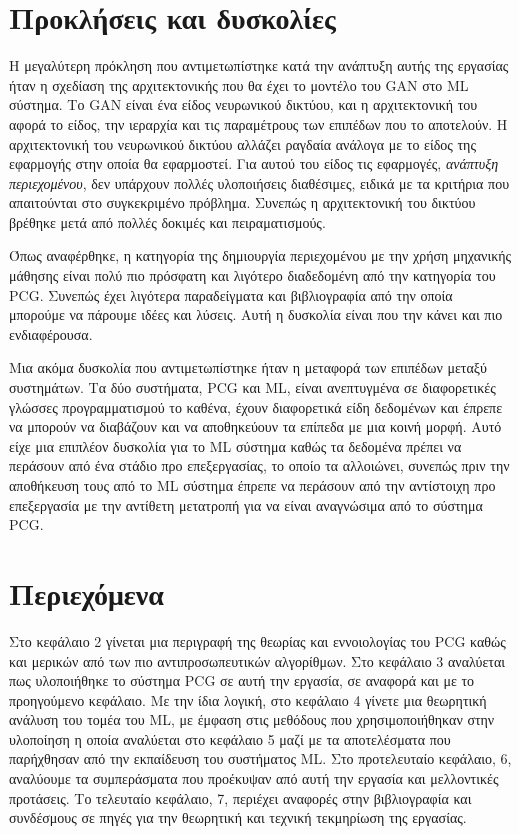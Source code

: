 \section{Προκλήσεις και δυσκολίες}
\par
Η μεγαλύτερη πρόκληση που αντιμετωπίστηκε κατά την ανάπτυξη αυτής της εργασίας ήταν η σχεδίαση της αρχιτεκτονικής που θα έχει το μοντέλο του GAN στο ML σύστημα. Το GAN είναι ένα είδος νευρωνικού δικτύου, και η αρχιτεκτονική του αφορά το είδος, την ιεραρχία και τις παραμέτρους των επιπέδων που το αποτελούν. Η αρχιτεκτονική του νευρωνικού δικτύου αλλάζει ραγδαία ανάλογα με το είδος της εφαρμογής στην οποία θα εφαρμοστεί. Για αυτού του είδος τις εφαρμογές, \textit{ανάπτυξη περιεχομένου}, δεν υπάρχουν πολλές υλοποιήσεις διαθέσιμες, ειδικά με τα κριτήρια που απαιτούνται στο συγκεκριμένο πρόβλημα. Συνεπώς η αρχιτεκτονική του δικτύου βρέθηκε μετά από πολλές δοκιμές και πειραματισμούς.
\par
Όπως αναφέρθηκε, η κατηγορία της δημιουργία περιεχομένου με την χρήση μηχανικής μάθησης είναι πολύ πιο πρόσφατη και λιγότερο διαδεδομένη από την κατηγορία του PCG. Συνεπώς έχει λιγότερα παραδείγματα και βιβλιογραφία από την οποία μπορούμε να πάρουμε ιδέες και λύσεις. Αυτή η δυσκολία είναι που την κάνει και πιο ενδιαφέρουσα.
\par
Μια ακόμα δυσκολία που αντιμετωπίστηκε ήταν η μεταφορά των επιπέδων μεταξύ συστημάτων. Τα δύο συστήματα, PCG και ML, είναι ανεπτυγμένα σε διαφορετικές γλώσσες προγραμματισμού το καθένα, έχουν διαφορετικά είδη δεδομένων και έπρεπε να μπορούν να διαβάζουν και να αποθηκεύουν τα επίπεδα με μια κοινή μορφή. Αυτό είχε μια επιπλέον δυσκολία για το ML σύστημα καθώς τα δεδομένα πρέπει να περάσουν από ένα στάδιο προ επεξεργασίας, το οποίο τα αλλοιώνει, συνεπώς πριν την αποθήκευση τους από το ML σύστημα έπρεπε να περάσουν από την αντίστοιχη προ επεξεργασία με την αντίθετη μετατροπή για να είναι αναγνώσιμα από το σύστημα PCG.


\section{Περιεχόμενα}
Στο κεφάλαιο 2 γίνεται μια περιγραφή της θεωρίας και εννοιολογίας του PCG καθώς και μερικών από των πιο αντιπροσωπευτικών αλγορίθμων. Στο κεφάλαιο 3 αναλύεται πως υλοποιήθηκε το σύστημα PCG σε αυτή την εργασία, σε αναφορά και με το προηγούμενο κεφάλαιο. Με την ίδια λογική, στο κεφάλαιο 4 γίνετε μια θεωρητική ανάλυση του τομέα του ML, με έμφαση στις μεθόδους που χρησιμοποιήθηκαν στην υλοποίηση η οποία αναλύεται στο κεφάλαιο 5 μαζί με τα αποτελέσματα που παρήχθησαν από την εκπαίδευση του συστήματος ML. Στο προτελευταίο κεφάλαιο, 6, αναλύουμε τα συμπεράσματα που προέκυψαν από αυτή την εργασία και μελλοντικές προτάσεις. Το τελευταίο κεφάλαιο, 7, περιέχει αναφορές στην βιβλιογραφία και συνδέσμους σε πηγές για την θεωρητική και τεχνική τεκμηρίωση της εργασίας.




